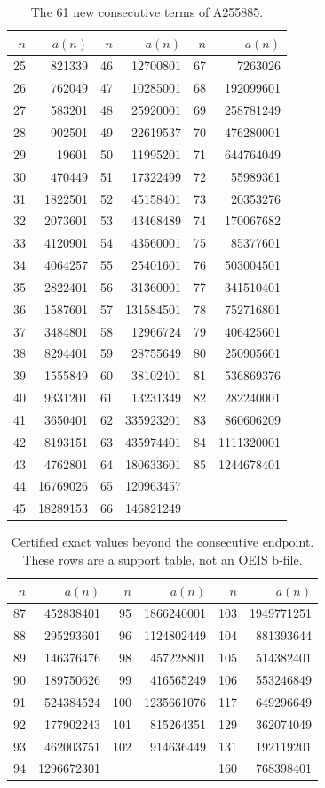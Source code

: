 \documentclass[11pt]{article}
\begin{document}
\begin{table}[tbp]
\centering
\caption{The 61 new consecutive terms of A255885.}\label{tab:contiguous}
\small
\begin{tabular}{rr@{\qquad}rr@{\qquad}rr}
\toprule
$n$ & $a(n)$ & $n$ & $a(n)$ & $n$ & $a(n)$\\
\midrule
25&821339&46&12700801&67&7263026\\
26&762049&47&10285001&68&192099601\\
27&583201&48&25920001&69&258781249\\
28&902501&49&22619537&70&476280001\\
29&19601&50&11995201&71&644764049\\
30&470449&51&17322499&72&55989361\\
31&1822501&52&45158401&73&20353276\\
32&2073601&53&43468489&74&170067682\\
33&4120901&54&43560001&75&85377601\\
34&4064257&55&25401601&76&503004501\\
35&2822401&56&31360001&77&341510401\\
36&1587601&57&131584501&78&752716801\\
37&3484801&58&12966724&79&406425601\\
38&8294401&59&28755649&80&250905601\\
39&1555849&60&38102401&81&536869376\\
40&9331201&61&13231349&82&282240001\\
41&3650401&62&335923201&83&860606209\\
42&8193151&63&435974401&84&1111320001\\
43&4762801&64&180633601&85&1244678401\\
44&16769026&65&120963457&&\\
45&18289153&66&146821249&&\\
\bottomrule
\end{tabular}
\end{table}

\begin{table}[htbp]
\centering
\caption{Certified exact values beyond the consecutive endpoint.  These rows
are a support table, not an OEIS b-file.}\label{tab:sparse}
\small
\begin{tabular}{rr@{\qquad}rr@{\qquad}rr}
\toprule
$n$ & $a(n)$ & $n$ & $a(n)$ & $n$ & $a(n)$\\
\midrule
87&452838401&95&1866240001&103&1949771251\\
88&295293601&96&1124802449&104&881393644\\
89&146376476&98&457228801&105&514382401\\
90&189750626&99&416565249&106&553246849\\
91&524384524&100&1235661076&117&649296649\\
92&177902243&101&815264351&129&362074049\\
93&462003751&102&914636449&131&192119201\\
94&1296672301&&&160&768398401\\
\bottomrule
\end{tabular}
\end{table}
\end{document}

